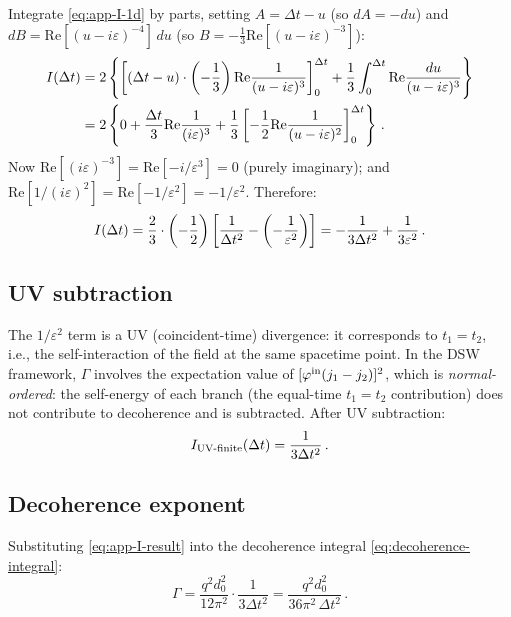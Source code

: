 Integrate \cref{eq:app-I-1d} by parts, setting
$A = \Delta t - u$ (so $dA = -du$) and
$dB = \mathrm{Re}[(u-i\varepsilon)^{-4}]\,du$ (so $B = -\tfrac{1}{3}\mathrm{Re}[(u-i\varepsilon)^{-3}]$):
%
\begin{align}
  I(\Delta t)
  &=
  2\left\{
    \left[(\Delta t-u)\cdot\left(-\frac{1}{3}\right)\mathrm{Re}\frac{1}{(u-i\varepsilon)^{3}}\right]_{0}^{\Delta t}
    +
    \frac{1}{3}\int_{0}^{\Delta t}\mathrm{Re}\frac{du}{(u-i\varepsilon)^{3}}
  \right\} \nonumber\\
  &=
  2\left\{
    0 + \frac{\Delta t}{3}\mathrm{Re}\frac{1}{(i\varepsilon)^{3}}
    +
    \frac{1}{3}\left[-\frac{1}{2}\mathrm{Re}\frac{1}{(u-i\varepsilon)^{2}}\right]_{0}^{\Delta t}
  \right\} \,.
\end{align}
%
Now $\mathrm{Re}[(i\varepsilon)^{-3}] = \mathrm{Re}[-i/\varepsilon^{3}] = 0$ (purely imaginary);
and $\mathrm{Re}[1/(i\varepsilon)^{2}] = \mathrm{Re}[-1/\varepsilon^{2}] = -1/\varepsilon^{2}$.
Therefore:
%
\begin{equation}
  I(\Delta t)
  =
  \frac{2}{3}\cdot\left(-\frac{1}{2}\right)\left[\frac{1}{\Delta t^{2}} - \left(-\frac{1}{\varepsilon^{2}}\right)\right]
  =
  -\frac{1}{3\Delta t^{2}} + \frac{1}{3\varepsilon^{2}} \,.
\end{equation}

\subsection*{UV subtraction}

The $1/\varepsilon^{2}$ term is a UV (coincident-time) divergence: it corresponds to
$t_{1} = t_{2}$, i.e., the self-interaction of the field at the same spacetime point.
In the DSW framework, $\Gamma$ involves the expectation value of $[\varphi^{\rm in}(j_{1}-j_{2})]^{2}$,
which is \emph{normal-ordered}: the self-energy of each branch (the equal-time
$t_{1}=t_{2}$ contribution) does not contribute to decoherence and is subtracted.
After UV subtraction:
%
\begin{equation}
  I_{\rm UV\text{-}finite}(\Delta t) = \frac{1}{3\Delta t^{2}} \,.
  \label{eq:app-I-result}
\end{equation}

\subsection*{Decoherence exponent}

Substituting \cref{eq:app-I-result} into the decoherence integral \cref{eq:decoherence-integral}:
%
\begin{equation}
  \Gamma
  =
  \frac{q^{2}d_{0}^{2}}{12\pi^{2}}\cdot\frac{1}{3\Delta t^{2}}
  =
  \frac{q^{2}d_{0}^{2}}{36\pi^{2}\,\Delta t^{2}} \,.
  \label{eq:app-Gamma-Deltat}
\end{equation}

